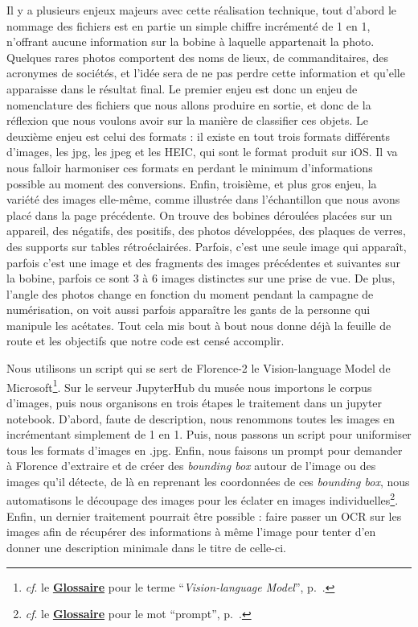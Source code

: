 Il y a plusieurs enjeux majeurs avec cette réalisation technique, tout d'abord le nommage des fichiers est en partie un simple chiffre incrémenté de 1 en 1, n'offrant aucune information sur la bobine à laquelle appartenait la photo. Quelques rares photos comportent des noms de lieux, de commanditaires, des acronymes de sociétés, et l'idée sera de ne pas perdre cette information et qu'elle apparaisse dans le résultat final. Le premier enjeu est donc un enjeu de nomenclature des fichiers que nous allons produire en sortie, et donc de la réflexion que nous voulons avoir sur la manière de classifier ces objets. Le deuxième enjeu est celui des formats : il existe en tout trois formats différents d'images, les jpg, les jpeg et les HEIC, qui sont le format produit sur iOS. Il va nous falloir harmoniser ces formats en perdant le minimum d'informations possible au moment des conversions. Enfin, troisième, et plus gros enjeu, la variété des images elle-même, comme illustrée dans l'échantillon que nous avons placé dans la page précédente. On trouve des bobines déroulées placées sur un appareil, des négatifs, des positifs, des photos développées, des plaques de verres, des supports sur tables rétroéclairées. Parfois, c'est une seule image qui apparaît, parfois c'est une image et des fragments des images précédentes et suivantes sur la bobine, parfois ce sont 3 à 6 images distinctes sur une prise de vue. De plus, l'angle des photos change en fonction du moment pendant la campagne de numérisation, on voit aussi parfois apparaître les gants de la personne qui manipule les acétates. Tout cela mis bout à bout nous donne déjà la feuille de route et les objectifs que notre code est censé accomplir.

Nous utilisons un script qui se sert de Florence-2 le Vision-language Model de Microsoft\footnote{\textit{cf}. le \textbf{\hyperref[sec:Glossaire]{Glossaire}} pour le terme \enquote{\textit{Vision-language Model}}, p.~\pageref{sec:Glossaire}.}. Sur le serveur JupyterHub du musée nous importons le corpus d'images, puis nous organisons en trois étapes le traitement dans un jupyter notebook. D'abord, faute de description, nous renommons toutes les images en incrémentant simplement de 1 en 1. Puis, nous passons un script pour uniformiser tous les formats d'images en .jpg. Enfin, nous faisons un prompt pour demander à Florence d'extraire et de créer des \textit{bounding box} autour de l'image ou des images qu'il détecte, de là en reprenant les coordonnées de ces \textit{bounding box}, nous automatisons le découpage des images pour les éclater en images individuelles\footnote{\textit{cf}. le \textbf{\hyperref[sec:Glossaire]{Glossaire}} pour le mot \enquote{prompt}, p.~\pageref{sec:Glossaire}.}. Enfin, un dernier traitement pourrait être possible : faire passer un OCR sur les images afin de récupérer des informations à même l'image pour tenter d'en donner une description minimale dans le titre de celle-ci. \hfill\break

